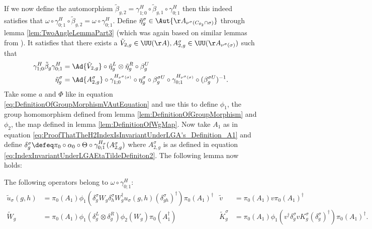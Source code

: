 If we now define the automorphism $\tilde{\beta}_{g,2}=\gamma^{H}_{1;0}\circ\tilde\beta_{g,1}\circ\gamma^{H}_{0;1}$ then this indeed satisfies that $\omega\circ\gamma^{H}_{0;1}\circ\tilde{\beta}_{g,2}=\omega\circ\gamma^{H}_{0;1}$. Define $\tilde\eta_g^\sigma\in\Aut{\AA_{\nu^{\sigma}(C_{\theta_2}\cap\sigma)}}$ through lemma \ref{lem:TwoAngleLemmaPart3} (which was again based on similar lemmas from \cite{Ogata2d}). It satisfies that there exists a $\tilde V_{2,g}\in\UU(\AA),A_{2,g}^{\sigma}\in\UU(\AA_{\nu^\sigma(\sigma)})$ such that
\begin{align}
	\label{eq:IndexInvariantUnderLGAEtaTildeDefiniton1}
	\gamma^{H}_{1;0}\tilde{\beta}_g\gamma^{H}_{0;1}&=\Ad{\tilde V_{2,g}}\circ\tilde{\eta}_g^L\otimes\tilde{\eta}_g^R\circ\beta_g^U\\
	\label{eq:IndexInvariantUnderLGAEtaTildeDefiniton2}
	\tilde{\eta}_g^\sigma&=\Ad{A_{2,g}^\sigma}\circ\gamma^{H_{\nu^{\sigma}(\sigma)}}_{1;0}\circ\eta_g^\sigma\circ\beta_g^{\sigma U}\circ\gamma^{H_{\nu^{\sigma}(\sigma)}}_{0;1}\circ(\beta_g^{\sigma U})^{-1}.
\end{align}
Take some $a$ and $\Phi$ like in equation \eqref{eq:DefinitionOfGroupMorphismVAutEquation} and use this to define $\phi_1$, the group homomorphism defined from lemma \ref{lem:DefinitionOfGroupMorphism} and $\phi_2$, the map defined in lemma \ref{lem:DefinitionOfWgMap}. Now take $A_1$ as in equation \eqref{eq:ProofThatTheH2IndexIsInvariantUnderLGA's_Definition_A1} and define $\delta_g^\sigma\defeq \pi_0\circ\alpha_0\circ\Theta\circ\gamma^{H_\sigma}_{0;1}(A^\sigma_{2,g})$ where $A^\sigma_{2,g}$ is as defined in equation \eqref{eq:IndexInvariantUnderLGAEtaTildeDefiniton2}. The following lemma now holds:
\begin{lemma}\label{lem:OperatorsBelongingToOmegaAfterH}
	The following operators belong to $\omega\circ\gamma^{H}_{0;1}:$
	\begin{align}
		\tilde u_\sigma(g,h)&=\pi_0(A_1) \phi_1\left(\delta^\sigma_g W_g\delta^\sigma_h W_g^\dagger u_\sigma(g,h)(\delta^\sigma_{gh})^\dagger\right)\pi_0(A_1)^\dagger&\tilde{v}&=\pi_0(A_1)v\pi_0(A_1)^\dagger\\
		\tilde{W}_g&=\pi_0(A_1)\phi_1(\delta^L_g\otimes\delta^R_g)\phi_2( W_g)\pi_0(A_1^\dagger)&\tilde{K}_g^\sigma&=\pi_0(A_1)\phi_1(v^\dagger \delta_g^\sigma v K_g^\sigma (\delta_g^\sigma)^\dagger) \pi_0(A_1)^\dagger.
	\end{align}
\end{lemma}
